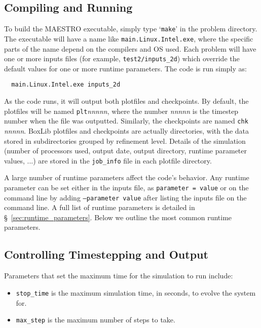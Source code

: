 \subsection{Compiling and Running}

To build the MAESTRO executable, simply type `{\tt make}' in the
problem directory.  The executable will have a name like
{\tt main.Linux.Intel.exe}, where the specific parts of 
the name depend on the compilers and OS used.  Each problem
will have one or more inputs files (for example, {\tt test2/inputs\_2d})
which override the default values for one or more runtime parameters.
The code is run simply as:
\begin{verbatim}
  main.Linux.Intel.exe inputs_2d
\end{verbatim}
As the code runs, it will output both plotfiles and checkpoints.
By default, the plotfiles will be named {\tt plt}{\em nnnnn}, where
the number {\em nnnnn} is the timestep number when the file was
outputted.  Similarly, the checkpoints are named {\tt chk}{\em
  nnnnn}.  BoxLib plotfiles and checkpoints are actually directories,
with the data stored in subdirectories grouped by refinement level.
Details of the simulation (number of processors used, output date,
output directory, runtime parameter values, ...) are stored in
the {\tt job\_info} file in each plotfile directory.

A large number of runtime parameters affect the code's behavior.  Any
runtime parameter can be set either in the inputs file, as {\tt parameter
  = value} or on the command line by adding {\tt --parameter value} after
listing the inputs file on the command line.  A full list of runtime
parameters is detailed in \S~\ref{sec:runtime_parameters}.  Below we
outline the most common runtime parameters.

\subsection{Controlling Timestepping and Output}

Parameters that set the maximum time for the simulation to run
include:
\begin{itemize}
\item {\tt stop\_time} is the maximum simulation time, in seconds,
      to evolve the system for.

\item {\tt max\_step} is the maximum number of steps to take.
\end{itemize}

